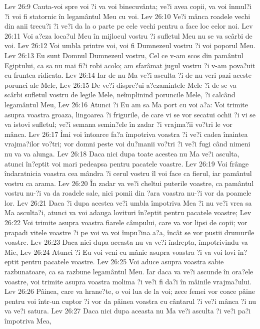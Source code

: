 Lev 26:9  Cauta-voi spre voi ?i va voi binecuvânta; ve?i avea copii, va voi înmul?i ?i voi fi statornic în legamântul Meu cu voi.
Lev 26:10  Ve?i mânca roadele vechi din anii trecu?i ?i ve?i da la o parte pe cele vechi pentru a face loc celor noi.
Lev 26:11  Voi a?eza loca?ul Meu în mijlocul vostru ?i sufletul Meu nu se va scârbi de voi.
Lev 26:12  Voi umbla printre voi, voi fi Dumnezeul vostru ?i voi poporul Meu.
Lev 26:13  Eu sunt Domnul Dumnezeul vostru, Cel ce v-am scos din pamântul Egiptului, ca sa nu mai fi?i robi acolo; am sfarâmat jugul vostru ?i v-am pova?uit cu fruntea ridicata.
Lev 26:14  Iar de nu Ma ve?i asculta ?i de nu veri pazi aceste porunci ale Mele,
Lev 26:15  De ve?i dispre?ui a?ezamintele Mele ?i de se va scârbi sufletul vostru de legile Mele, neîmplinind poruncile Mele, ?i calcând legamântul Meu,
Lev 26:16  Atunci ?i Eu am sa Ma port cu voi a?a: Voi trimite asupra voastra groaza, lingoarea ?i frigurile, de care vi se vor secatui ochii ?i vi se va istovi sufletul; ve?i semana semin?ele în zadar ?i vrajma?ii vo?tri le vor mânca.
Lev 26:17  Îmi voi întoarce fa?a împotriva voastra ?i ve?i cadea înaintea vrajma?ilor vo?tri; vor domni peste voi du?manii vo?tri ?i ve?i fugi când nimeni nu va va alunga.
Lev 26:18  Daca nici dupa toate acestea nu Ma ve?i asculta, atunci în?eptit voi mari pedeapsa pentru pacatele voastre.
Lev 26:19  Voi frânge îndaratnicia voastra cea mândra ?i cerul vostru îl voi face ca fierul, iar pamântul vostru ca arama.
Lev 26:20  În zadar va ve?i cheltui puterile voastre, ca pamântul vostru nu-?i va da roadele sale, nici pomii din ?ara voastra nu-?i vor da poamele lor.
Lev 26:21  Daca ?i dupa acestea ve?i umbla împotriva Mea ?i nu ve?i vrea sa Ma asculta?i, atunci va voi adauga lovituri în?eptit pentru pacatele voastre;
Lev 26:22  Voi trimite asupra voastra fiarele câmpului, care va vor lipsi de copii; vor prapadi vitele voastre ?i pe voi va voi împu?ina a?a, încât se vor pustii drumurile voastre.
Lev 26:23  Daca nici dupa aceasta nu va ve?i îndrepta, împotrivindu-va Mie,
Lev 26:24  Atunci ?i Eu voi veni cu mânie asupra voastra ?i va voi lovi în?eptit pentru pacatele voastre.
Lev 26:25  Voi aduce asupra voastra sabie razbunatoare, ca sa razbune legamântul Meu. Iar daca va ve?i ascunde în ora?ele voastre, voi trimite asupra voastra molima ?i ve?i fi da?i în mâinile vrajma?ului.
Lev 26:26  Pâinea, care va hrane?te, o voi lua de la voi; zece femei vor coace pâine pentru voi într-un cuptor ?i vor da pâinea voastra cu cântarul ?i ve?i mânca ?i nu va ve?i satura.
Lev 26:27  Daca nici dupa aceasta nu Ma ve?i asculta ?i ve?i pa?i împotriva Mea,
